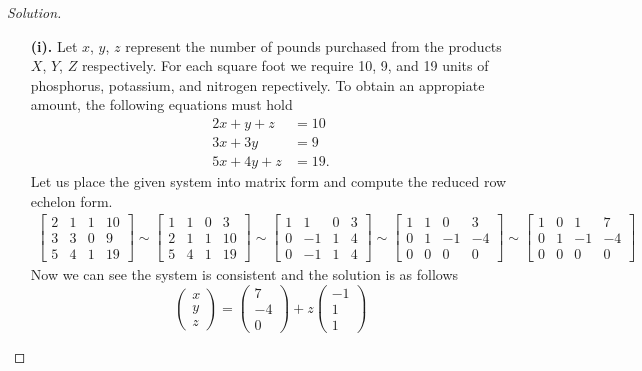 \documentclass[ 12pt ]{article}
\begin{document}
\begin{enumerate}
	\begin{proof}[Solution]\renewcommand{\qedsymbol}{}
		\begin{enumerate}
			\item[\textbf{(i).}] Let $x$, $y$, $z$ represent the number of pounds purchased from the products $X$, $Y$, $Z$ respectively. For each square foot we require
				10, 9, and 19 units of phosphorus, potassium, and nitrogen repectively. To obtain an appropiate amount, the following equations must hold
				\begin{align*}
					2x + y + z &= 10 \\
					3x + 3y &= 9 \\
					5x + 4y + z &= 19.
				\end{align*}
				Let us place the given system into matrix form and compute the reduced row echelon form.
				\begin{align*}
					\begin{bmatrix} 2 & 1 & 1 & 10 \\ 3 & 3 & 0 & 9 \\ 5 & 4 & 1 & 19 \end{bmatrix}
					\sim \begin{bmatrix} 1 & 1 & 0 & 3 \\ 2 & 1 & 1 & 10 \\ 5 & 4 & 1 & 19 \end{bmatrix}
					\sim \begin{bmatrix} 1 & 1 & 0 & 3 \\ 0 & -1 & 1 & 4 \\ 0 & -1 & 1 & 4 \end{bmatrix}
					\sim \begin{bmatrix} 1 & 1 & 0 & 3 \\ 0 & 1 & -1 & -4 \\ 0 & 0 & 0 & 0 \end{bmatrix}
					\sim \begin{bmatrix} 1 & 0 & 1 & 7 \\ 0 & 1 & -1 & -4 \\ 0 & 0 & 0 & 0 \end{bmatrix}
				\end{align*}
				Now we can see the system is consistent and the solution is as follows
				$$\begin{pmatrix} x \\ y \\ z \end{pmatrix} = \begin{pmatrix} 7 \\ -4 \\ 0 \end{pmatrix} + z\begin{pmatrix} -1 \\ 1 \\ 1 \end{pmatrix}$$

\end{enumerate}
\end{proof}
\end{enumerate}
\end{document}
